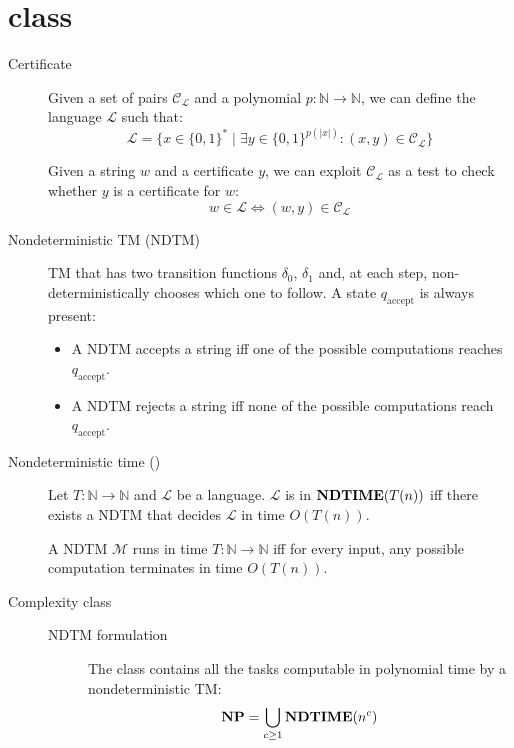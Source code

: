\section{\NP class}

\begin{description}
    \item[Certificate] 
        Given a set of pairs $\mathcal{C}_\mathcal{L}$ and a polynomial $p: \mathbb{N} \rightarrow \mathbb{N}$, 
        we can define the language $\mathcal{L}$ such that:
        \[ \mathcal{L} = \{ x \in \{0, 1\}^* \mid \exists y \in \{0, 1\}^{p(\vert x \vert)}: (x, y) \in \mathcal{C}_\mathcal{L} \} \]

        Given a string $w$ and a certificate $y$,
        we can exploit $\mathcal{C}_\mathcal{L}$ as a test to check whether $y$ is a certificate for $w$:
        \[ w \in \mathcal{L} \iff (w, y) \in \mathcal{C}_\mathcal{L} \]

    \item[Nondeterministic TM (NDTM)] 
        TM that has two transition functions $\delta_0$, $\delta_1$ and, at each step, non-deterministically chooses which one to follow.
        A state $q_\text{accept}$ is always present:
        \begin{itemize}
            \item A NDTM accepts a string iff one of the possible computations reaches $q_\text{accept}$.
            \item A NDTM rejects a string iff none of the possible computations reach $q_\text{accept}$.
        \end{itemize}

    \item[Nondeterministic time (\NDTIME)] 
        Let  $T: \mathbb{N} \rightarrow \mathbb{N}$ and $\mathcal{L}$ be a language.
        $\mathcal{L}$ is in $\textbf{NDTIME}(T(n))$ iff
        there exists a NDTM that decides $\mathcal{L}$ in time $O(T(n))$.

        \begin{remark}
            A NDTM $\mathcal{M}$ runs in time $T: \mathbb{N} \rightarrow \mathbb{N}$ iff
            for every input, any possible computation terminates in time $O(T(n))$.
        \end{remark}
    
    \item[Complexity class \NP] 
        \phantom{}
        \begin{description}
            \item[NDTM formulation] 
                The class \NP contains all the tasks computable in polynomial time by a nondeterministic TM:
                \[ \textbf{NP} = \bigcup_{c \geq 1} \textbf{NDTIME}(n^c) \]


\end{description}
\end{description}
